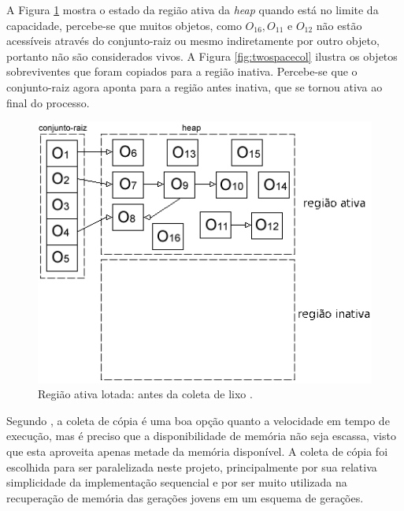 \documentclass[ccc, pg2]{esinucpel}
\begin{document}
A Figura \ref{fig:twospacefull} mostra o estado da região ativa da \textit{heap} quando está no limite da capacidade, percebe-se que muitos objetos, como $O_{16}, O_{11}$ e $O_{12}$ não estão acessíveis através do conjunto-raiz ou mesmo indiretamente por outro objeto, portanto não são considerados vivos. A Figura \ref{fig:twospacecol} ilustra os objetos sobreviventes que foram copiados para a região inativa. Percebe-se que o conjunto-raiz agora aponta para a região antes inativa, que se tornou ativa ao final do processo.

\begin{figure}[h]
\centering
\includegraphics[scale=.55]{images/twospace_full.png}
\caption{Região ativa lotada: antes da coleta de lixo \cite{bib:marcos}.}
\label{fig:twospacefull}
\end{figure}

Segundo \cite{bib:marcos}, a coleta de cópia é uma boa opção quanto a velocidade em tempo de execução, mas é preciso que a disponibilidade de memória não seja escassa, visto que esta aproveita apenas metade da memória disponível. %
A coleta de cópia foi escolhida para ser paralelizada neste projeto, principalmente por sua relativa simplicidade da implementação sequencial e por ser muito utilizada na recuperação de memória das gerações jovens em um esquema de gerações.

\end{document}
